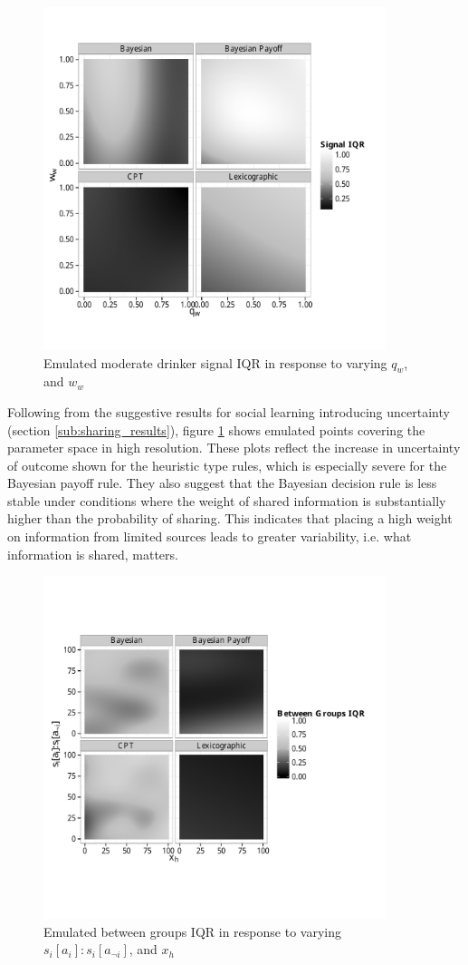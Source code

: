 \documentclass[graybox]{svmult}
\begin{document}
\begin{figure}[H]
\includegraphics[width=100mm]{figures/unfixed_emu_sig_iqr}
\caption{Emulated moderate drinker signal IQR in response to varying \(q_{w}\), and \(w_{w}\)}
\label{fig:emulated_sharing_iqr}
\end{figure}

Following from the suggestive results for social learning introducing uncertainty (section \ref{sub:sharing_results}), figure \ref{fig:emulated_sharing_iqr} shows emulated points covering the parameter space in high resolution. These plots reflect the increase in uncertainty of outcome shown for the heuristic type rules, which is especially severe for the Bayesian payoff rule. They also suggest that the Bayesian decision rule is less stable under conditions where the weight of shared information is substantially higher than the probability of sharing. This indicates that placing a high weight on information from limited sources leads to greater variability, i.e. what information is shared, matters.

\begin{figure}[H]
\includegraphics[width=100mm]{figures/unfixed_emu_payoff_honesty_group_iqr}
\caption{Emulated between groups IQR in response to varying \(s_{i}[a_{i}]:s_{i}[a_{\neg i}]\), and \(x_{h}\)}
\label{fig:emulated_payoff_group_iqr}
\end{figure}
\end{document}
